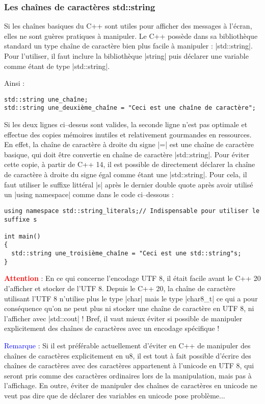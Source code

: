 \subsubsection{Les chaînes de caractères std::string}

Si les chaînes basiques du C++ sont utiles pour afficher des messages à l'écran, elles ne sont guères pratiques à manipuler. Le C++ possède dans sa bibliothèque standard un type chaîne de caractère bien plus facile à manipuler : |std::string|. Pour l'utiliser, il faut inclure la bibliothèque |string| puis déclarer une variable comme étant de type |std::string|.

Ainsi :
\begin{lstlisting}[caption=Déclaration d'une std::string]
std::string une_chaîne;
std::string une_deuxième_chaîne = "Ceci est une chaîne de caractère";
\end{lstlisting}

Si les deux lignes ci--dessus sont valides, la seconde ligne n'est pas optimale et effectue des copies mémoires inutiles et relativement gourmandes en ressources. En effet, la chaîne de caractère à droite du signe |=| est une chaîne de caractère basique, qui doit être convertie en chaîne de caractère |std::string|. 
Pour éviter cette copie, à partir de C++ 14, il est possible
de directement déclarer la chaîne de caractère à droite du signe égal comme étant une |std::string|. Pour cela, il faut utiliser le suffixe littéral |s| après le dernier double quote après avoir utilisé un |using namespace| comme dans le code ci--dessous :
\begin{lstlisting}[caption=Utilisation d'un litéral pour définir un std::string]
using namespace std::string_literals;// Indispensable pour utiliser le suffixe s

int main()
{
  std::string une_troisième_chaîne = "Ceci est une std::string"s; 
}
\end{lstlisting}

\textcolor{red}{\bf Attention} :
En ce qui concerne l'encodage UTF 8, il était facile avant le C++ 20 d'afficher et stocker de l'UTF 8.
Depuis le C++ 20, la chaîne de caractère utilisant l'UTF 8 n'utilise plus le type |char| mais le type
|char8_t| ce qui a pour conséquence qu'on ne peut plus ni stocker une chaîne de caractère en UTF 8, ni l'afficher
avec |std::cout| ! Bref, il vaut mieux éviter si possible de manipuler explicitement des chaînes de caractères avec
un encodage spécifique !

\textcolor{blue}{Remarque} : Si il est préférable actuellement d'éviter en C++ de manipuler des chaînes de caractères
explicitement en u8, il est tout à fait possible d'écrire des chaînes de caractères avec des caractères appartenent à
l'unicode en UTF 8, qui seront pris comme des caractères ordinaires lors de la manipulation, mais pas à l'affichage.
En outre, éviter de manipuler des chaînes de caractères en unicode ne veut pas dire que de déclarer des variables en unicode pose problème...

